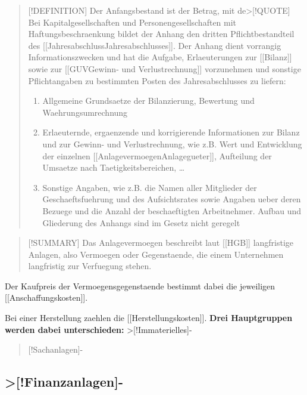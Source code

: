 \begin{quote}
{[}!DEFINITION{]} Der Anfangsbestand ist der Betrag, mit
de\textgreater{[}!QUOTE{]} Bei Kapitalgesellschaften und
Personengesellschaften mit Haftungsbeschraenkung bildet der Anhang den
dritten Pflichtbestandteil des
{[}{[}Jahresabschluss\textbar Jahresabschlusses{]}{]}. Der Anhang dient
vorrangig Informationszwecken und hat die Aufgabe, Erlaeuterungen zur
{[}{[}Bilanz{]}{]} sowie zur {[}{[}GUV\textbar Gewinn- und
Verlustrechnung{]}{]} vorzunehmen und sonstige Pflichtangaben zu
bestimmten Posten des Jahresabschlusses zu liefern:

\begin{enumerate}
\def\labelenumi{\arabic{enumi})}
\item
  Allgemeine Grundsaetze der Bilanzierung, Bewertung und
  Waehrungsumrechnung
\item
  Erlaeuternde, ergaenzende und korrigierende Informationen zur Bilanz und
  zur Gewinn- und Verlustrechnung, wie z.B. Wert und Entwicklung der
  einzelnen {[}{[}Anlagevermoegen\textbar Anlagegueter{]}{]}, Aufteilung
  der Umsaetze nach Taetigkeitsbereichen, \ldots{}
\item
  Sonstige Angaben, wie z.B. die Namen aller Mitglieder der
  Geschaeftsfuehrung und des Aufsichtsrates sowie Angaben ueber deren
  Bezuege und die Anzahl der beschaeftigten Arbeitnehmer. Aufbau und
  Gliederung des Anhangs sind im Gesetz nicht geregelt
\end{enumerate}
\end{quote}

\begin{quote}
{[}!SUMMARY{]} Das Anlagevermoegen beschreibt laut {[}{[}HGB{]}{]}
langfristige Anlagen, also Vermoegen oder Gegenstaende, die einem
Unternehmen langfristig zur Verfuegung stehen.
\end{quote}

Der Kaufpreis der Vermoegensgegenstaende bestimmt dabei die jeweiligen
{[}{[}Anschaffungskosten{]}{]}.

Bei einer Herstellung zaehlen die {[}{[}Herstellungskosten{]}{]}.
\textbf{Drei Hauptgruppen werden dabei unterschieden:}
\textgreater{[}!Immaterielles{]}-

\begin{quote}
{[}!Sachanlagen{]}-
\end{quote}

\subsection{\textgreater{[}!Finanzanlagen{]}-}\label{finanzanlagen-}

